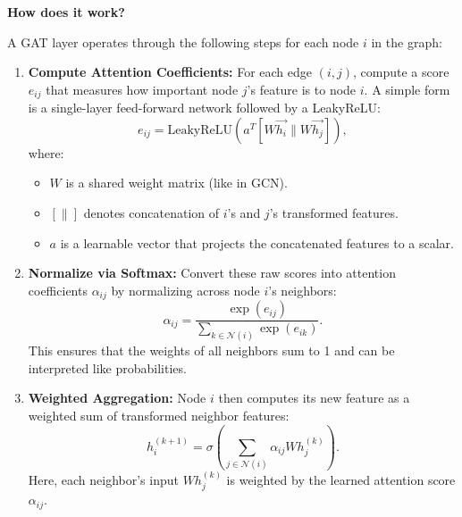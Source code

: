 \documentclass{article}
\begin{document}
\textbf{How does it work?}

A GAT layer operates through the following steps \cite{veličković2018graphattentionnetworks} for each node $i$ in the graph:

\begin{enumerate}
      \item \textbf{Compute Attention Coefficients:} For each edge $(i, j)$, compute a score $e_{ij}$ that measures how important node $j$'s feature is to node $i$. A simple form is a single-layer feed-forward network followed by a LeakyReLU:
            \begin{equation}
                  e_{ij} = \text{LeakyReLU}\left(a^T \left[W \vec{h_i} \| W \vec{h_j}\right]\right),
            \end{equation}
            where:
            \begin{itemize}
                  \item $W$ is a shared weight matrix (like in GCN).
                  \item $\left[\|\right]$ denotes concatenation of $i$'s and $j$'s transformed features.
                  \item $a$ is a learnable vector that projects the concatenated features to a scalar.
            \end{itemize}

      \item \textbf{Normalize via Softmax:} Convert these raw scores into attention coefficients $\alpha_{ij}$ by normalizing across node $i$'s neighbors:
            \begin{equation}
                  \alpha_{ij} = \frac{\exp(e_{ij})}{\sum_{k \in \mathcal{N}(i)} \exp(e_{ik})}.
            \end{equation}
            This ensures that the weights of all neighbors sum to 1 and can be interpreted like probabilities.

      \item \textbf{Weighted Aggregation:} Node $i$ then computes its new feature as a weighted sum of transformed neighbor features:
            \begin{equation}
                  h_i^{(k+1)} = \sigma\left(\sum_{j \in \mathcal{N}(i)} \alpha_{ij} W h_j^{(k)}\right).
            \end{equation}
            Here, each neighbor's input $W h_j^{(k)}$ is weighted by the learned attention score $\alpha_{ij}$.
\end{enumerate}
\end{document}
